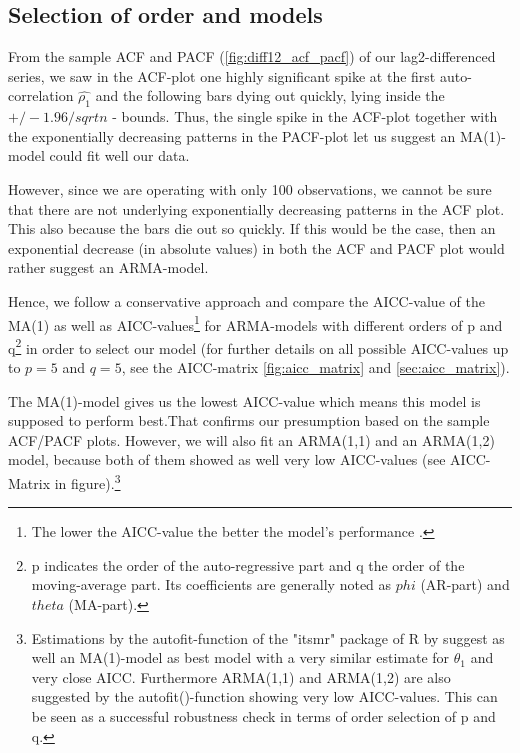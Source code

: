 \documentclass[11pt,a4paper]{article}
\begin{document}
\subsection{Selection of order and models}

From the sample ACF and PACF (\cref{fig:diff12_acf_pacf}) of our lag2-differenced series, we saw in the ACF-plot one highly significant spike at the first auto-correlation $\hat{\rho_1}$ and the following bars dying out quickly, lying inside the $+/-1.96/sqrt{n}$ - bounds.
Thus, the single spike in the ACF-plot together with the exponentially decreasing patterns in the PACF-plot let us suggest an MA(1)-model could fit well our data.

However, since we are operating with only 100 observations, we cannot be sure that there are not underlying exponentially decreasing patterns in the ACF plot.
This also because the bars die out so quickly.
If this would be the case, then an exponential decrease (in absolute values) in both the ACF and PACF plot would rather suggest an ARMA-model.


Hence, we follow a conservative approach and compare the AICC-value of the MA(1) as well as AICC-values\footnote{
    The lower the AICC-value the better the model's performance \citep{aic86}.
}
for ARMA-models with different orders of p and q\footnote{
    p indicates the order of the auto-regressive part and q the order of the moving-average part.
    Its coefficients are generally noted as $phi$ (AR-part) and $theta$ (MA-part).
} 
in order to select our model (for further details on all possible AICC-values up to $p=5$ and $q=5$, see the AICC-matrix \cref{fig:aicc_matrix} and \cref{sec:aicc_matrix}).

The MA(1)-model gives us the lowest AICC-value which means this model is supposed to perform best.That confirms our presumption based on the sample ACF/PACF plots.
However, we will also fit an ARMA(1,1) and an ARMA(1,2) model, because both of them showed as well very low AICC-values (see AICC-Matrix in figure).\footnote{
    Estimations by the autofit-function of the "itsmr" package of R by \citet{R_itsmr} suggest as well an MA(1)-model as best model with a very similar estimate for $\theta_1$ and very close AICC.
    Furthermore ARMA(1,1) and ARMA(1,2) are also suggested by the autofit()-function showing very low AICC-values.
    This can be seen as a successful robustness check in terms of order selection of p and q.
}
\end{document}

